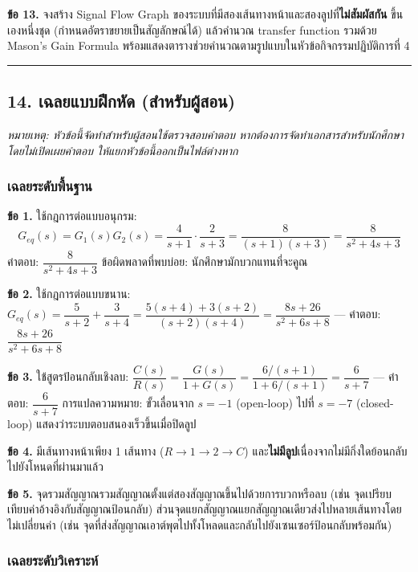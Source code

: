\textbf{ข้อ 13.} จงสร้าง Signal Flow Graph ของระบบที่มีสองเส้นทางหน้าและสองลูปที่\textbf{ไม่สัมผัสกัน} ขึ้นเองหนึ่งชุด (กำหนดอัตราขยายเป็นสัญลักษณ์ได้) แล้วคำนวณ transfer function รวมด้วย Mason's Gain Formula พร้อมแสดงตารางช่วยคำนวณตามรูปแบบในหัวข้อกิจกรรมปฏิบัติการที่ 4

\par\noindent\rule{\textwidth}{0.4pt}\par

\newpage

\subsection{14. เฉลยแบบฝึกหัด (สำหรับผู้สอน)}

\textit{หมายเหตุ: หัวข้อนี้จัดทำสำหรับผู้สอนใช้ตรวจสอบคำตอบ หากต้องการจัดทำเอกสารสำหรับนักศึกษาโดยไม่เปิดเผยคำตอบ ให้แยกหัวข้อนี้ออกเป็นไฟล์ต่างหาก}

\subsubsection{เฉลยระดับพื้นฐาน}

\textbf{ข้อ 1.} ใช้กฎการต่อแบบอนุกรม:
\[
G_{eq}(s)=G_1(s)G_2(s)=\dfrac{4}{s+1}\cdot\dfrac{2}{s+3}
=\dfrac{8}{(s+1)(s+3)}=\dfrac{8}{s^2+4s+3}
\]
คำตอบ: $\dfrac{8}{s^2+4s+3}$ ข้อผิดพลาดที่พบบ่อย: นักศึกษามักบวกแทนที่จะคูณ

\textbf{ข้อ 2.} ใช้กฎการต่อแบบขนาน: $G_{eq}(s)=\dfrac{5}{s+2}+\dfrac{3}{s+4}=\dfrac{5(s+4)+3(s+2)}{(s+2)(s+4)}=\dfrac{8s+26}{s^2+6s+8}$ — คำตอบ: $\dfrac{8s+26}{s^2+6s+8}$

\textbf{ข้อ 3.} ใช้สูตรป้อนกลับเชิงลบ: $\dfrac{C(s)}{R(s)}=\dfrac{G(s)}{1+G(s)}=\dfrac{6/(s+1)}{1+6/(s+1)}=\dfrac{6}{s+7}$ — คำตอบ: $\dfrac{6}{s+7}$ การแปลความหมาย: ขั้วเลื่อนจาก $s=-1$ (open-loop) ไปที่ $s=-7$ (closed-loop) แสดงว่าระบบตอบสนองเร็วขึ้นเมื่อปิดลูป

\textbf{ข้อ 4.} มีเส้นทางหน้าเพียง 1 เส้นทาง ($R\to1\to2\to C$) และ\textbf{ไม่มีลูป}เนื่องจากไม่มีกิ่งใดย้อนกลับไปยังโหนดที่ผ่านมาแล้ว

\textbf{ข้อ 5.} จุดรวมสัญญาณรวมสัญญาณตั้งแต่สองสัญญาณขึ้นไปด้วยการบวกหรือลบ (เช่น จุดเปรียบเทียบค่าอ้างอิงกับสัญญาณป้อนกลับ) ส่วนจุดแยกสัญญาณแยกสัญญาณเดียวส่งไปหลายเส้นทางโดยไม่เปลี่ยนค่า (เช่น จุดที่ส่งสัญญาณเอาต์พุตไปทั้งโหลดและกลับไปยังเซนเซอร์ป้อนกลับพร้อมกัน)

\subsubsection{เฉลยระดับวิเคราะห์}

